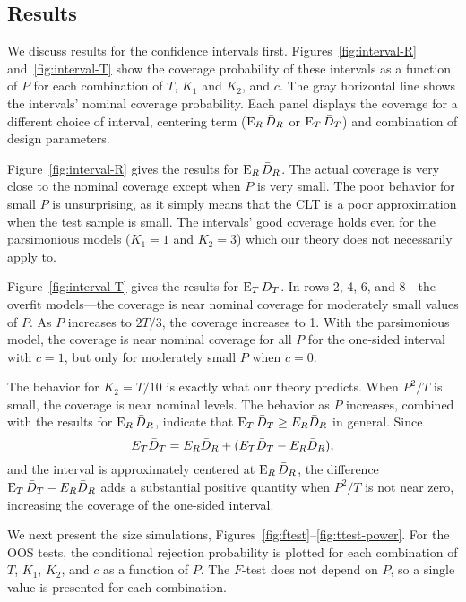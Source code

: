 \documentclass[12pt]{article}
\begin{document}
\subsection{Results}

We discuss results for the confidence intervals first.
Figures~\ref{fig:interval-R} and~\ref{fig:interval-T} show the
coverage probability of these intervals as a function of $P$ for each
combination of $T$, $K_1$ and $K_2$, and $c$.  The gray horizontal
line shows the intervals' nominal coverage probability.  Each panel
displays the coverage for a different choice of interval, centering
term ($\operatorname{E}_R \bar{D}_{R}$ or $\operatorname{E}_T \bar{D}_{T}$) and combination of design
parameters.

Figure~\ref{fig:interval-R} gives the results for $\operatorname{E}_R \bar{D}_{R}$.  The
actual coverage is very close to the nominal coverage except when $P$
is very small.  The poor behavior for small $P$ is unsurprising, as it
simply means that the CLT is a poor approximation when the test
sample is small.  The intervals' good coverage holds even for the
parsimonious models ($K_1=1$ and $K_2= 3$) which our theory does not
necessarily apply to.

Figure~\ref{fig:interval-T} gives the results for $\operatorname{E}_T \bar{D}_{T}$.  In
rows 2, 4, 6, and 8---the overfit models---the coverage is near
nominal coverage for moderately small values of $P$.  As $P$ increases
to $2T/3$, the coverage increases to 1.  With the parsimonious model,
the coverage is near nominal coverage for all $P$ for the one-sided
interval with $c=1$, but only for moderately small $P$ when $c=0$.

The behavior for $K_2 = T/10$ is exactly what our theory predicts.
When $P^2/T$ is small, the coverage is near nominal levels.  The
behavior as $P$ increases, combined with the results for $\operatorname{E}_R
\bar{D}_{R}$, indicate that $\operatorname{E}_T \bar{D}_{T} \geq E_R \bar{D}_{R}$ in general.
Since
\[E_{T} \bar{D}_{T} = E_{R} \bar{D}_{R} + (E_{T} \bar{D}_{T} - E_{R} \bar{D}_{R}), \] and the
interval is approximately centered at $\operatorname{E}_R \bar{D}_{R}$, the difference
$\operatorname{E}_{T} \bar{D}_{T} - E_{R} \bar{D}_{R}$ adds a substantial positive quantity when
$P^2/T$ is not near zero, increasing the coverage of the one-sided
interval.

We next present the size simulations,
Figures~\ref{fig:ftest}--\ref{fig:ttest-power}.  For the OOS tests,
the conditional rejection probability is plotted for each combination
of $T$, $K_1$, $K_2$, and $c$ as a function of $P$.  The $F$-test does
not depend on $P$, so a single value is presented for each
combination.
\end{document}
